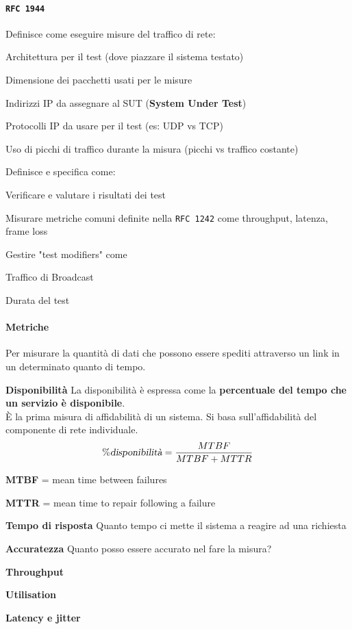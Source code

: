 \documentclass[10pt]{book}
\begin{document}
\paragraph{\texttt{RFC 1944}} Definisce come eseguire misure del traffico di rete:
\begin{list}{-}{}
	\item Architettura per il test (dove piazzare il sistema testato)
	\item Dimensione dei pacchetti usati per le misure
	\item Indirizzi IP da assegnare al SUT (\textbf{System Under Test})
	\item Protocolli IP da usare per il test (es: UDP vs TCP)
	\item Uso di picchi di traffico durante la misura (picchi vs traffico costante)
\end{list}
Definisce e specifica come:
\begin{list}{-}{}
	\item Verificare e valutare i risultati dei test
	\item Misurare metriche comuni definite nella \texttt{RFC 1242} come throughput, latenza, frame loss
	\item Gestire "test modifiers" come
	\begin{list}{-}{}
		\item Traffico di Broadcast
		\item Durata del test
	\end{list}
\end{list}
\paragraph{Metriche} Per misurare la quantità di dati che possono essere spediti attraverso un link in un determinato quanto di tempo.
\begin{list}{}{}
	\item \textbf{Disponibilità} La disponibilità è espressa come la \textbf{percentuale del tempo che un servizio è disponibile}.\\
È la prima misura di affidabilità di un sistema. Si basa sull'affidabilità del componente di rete individuale.
$$ \% \textsl{disponibilità} = \frac{MTBF}{MTBF + MTTR} $$
\begin{list}{}{}
	\item \textbf{MTBF} = mean time between failures
	\item \textbf{MTTR} = mean time to repair following a failure
\end{list}
	\item \textbf{Tempo di risposta} Quanto tempo ci mette il sistema a reagire ad una richiesta
	\item \textbf{Accuratezza} Quanto posso essere accurato nel fare la misura?
	\item \textbf{Throughput}
	\item \textbf{Utilisation}
	\item \textbf{Latency e jitter}
\end{list}
\end{document}

